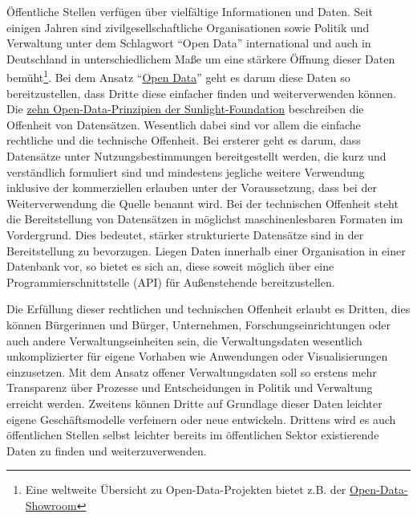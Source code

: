 \documentclass[,a4paper]{article}
\begin{document}
Öffentliche Stellen verfügen über vielfältige Informationen und Daten.
Seit einigen Jahren sind zivilgesellschaftliche Organisationen sowie
Politik und Verwaltung unter dem Schlagwort ``Open Data'' international
und auch in Deutschland in unterschiedlichem Maße um eine stärkere
Öffnung dieser Daten bemüht\footnote{Eine weltweite Übersicht zu
  Open-Data-Projekten bietet z.B. der
  \href{http://opendata-showroom.org/de/}{Open-Data-Showroom}}. Bei dem
Ansatz ``\href{https://de.wikipedia.org/wiki/Open_data}{Open Data}''
geht es darum diese Daten so bereitzustellen, dass Dritte diese
einfacher finden und weiterverwenden können. Die
\href{https://sunlightfoundation.com/policy/documents/ten-open-data-principles/}{zehn
Open-Data-Prinzipien der Sunlight-Foundation} beschreiben die Offenheit
von Datensätzen. Wesentlich dabei sind vor allem die einfache rechtliche
und die technische Offenheit. Bei ersterer geht es darum, dass
Datensätze unter Nutzungsbestimmungen bereitgestellt werden, die kurz
und verständlich formuliert sind und mindestens jegliche weitere
Verwendung inklusive der kommerziellen erlauben unter der Voraussetzung,
dass bei der Weiterverwendung die Quelle benannt wird. Bei der
technischen Offenheit steht die Bereitstellung von Datensätzen in
möglichst maschinenlesbaren Formaten im Vordergrund. Dies bedeutet,
stärker strukturierte Datensätze sind in der Bereitstellung zu
bevorzugen. Liegen Daten innerhalb einer Organisation in einer Datenbank
vor, so bietet es sich an, diese soweit möglich über eine
Programmierschnittstelle (API) für Außenstehende bereitzustellen.

Die Erfüllung dieser rechtlichen und technischen Offenheit erlaubt es
Dritten, dies können Bürgerinnen und Bürger, Unternehmen,
Forschungseinrichtungen oder auch andere Verwaltungseinheiten sein, die
Verwaltungsdaten wesentlich unkomplizierter für eigene Vorhaben wie
Anwendungen oder Visualisierungen einzusetzen. Mit dem Ansatz offener
Verwaltungsdaten soll so erstens mehr Transparenz über Prozesse und
Entscheidungen in Politik und Verwaltung erreicht werden. Zweitens
können Dritte auf Grundlage dieser Daten leichter eigene
Geschäftsmodelle verfeinern oder neue entwickeln. Drittens wird es auch
öffentlichen Stellen selbst leichter bereits im öffentlichen Sektor
existierende Daten zu finden und weiterzuverwenden.
\end{document}
